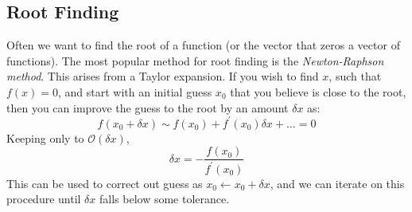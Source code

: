 \subsection{Root Finding}

Often we want to find the root of a function (or the vector that zeros
a vector of functions).  The most popular method for root finding is
the {\em Newton-Raphson method}.  This arises from a Taylor expansion.
If you wish to find $x$, such that $f(x) = 0$, and start with an
initial guess $x_0$ that you believe is close to the root, then you
can improve the guess to the root by an amount $\delta x$ as:
\begin{equation}
f(x_0 + \delta x) \sim f(x_0) + f^\prime(x_0) \delta x + \ldots = 0
\end{equation}
Keeping only to $\mathcal{O}(\delta x)$, 
\begin{equation}
\label{eq:intro:newtonsmethod}
  \delta x = -\frac{f(x_0)}{f^\prime(x_0)}
\end{equation}
This can be used to correct out guess as $x_0 \leftarrow x_0 + \delta
x$, and we can iterate on this procedure until $\delta x$ falls below
some tolerance.

